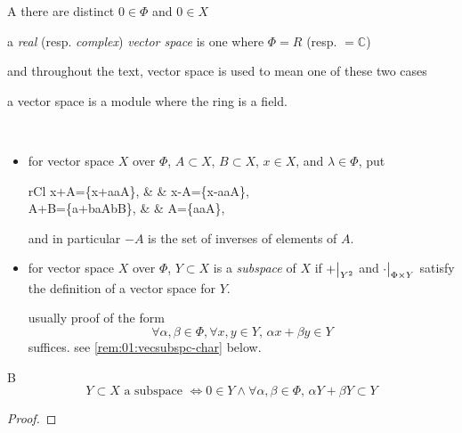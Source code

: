 \begin{rem}{A}
  there are distinct ${0\in\Phi}$ and ${0\in X}$
\end{rem}

\begin{defn}
  a \emph{real} (resp. \emph{complex}) \emph{vector space}
  is one where ${\Phi=R}$ (resp. ${=\mathbb{C}}$)

  and throughout the text, vector space is used to mean one of these
  two cases
\end{defn}

\begin{addcomment}
  a vector space is a module where the ring is a field.
\end{addcomment}

\begin{defn}\
  \begin{itemize}
  \item
    for vector space $X$ over $\Phi$, ${A\subset X}$, ${B\subset X}$,
    ${x\in X}$, and ${\lambda\in\Phi}$, put
    \begin{IEEEeqnarray*}{rCl}
      x+A=\{x+a\mid a\in A\}, & \quad & x-A=\{x-a\mid a\in A\}, \\
      A+B=\{a+b\mid a\in A\land b\in B\}, & \quad &
      \lambda A=\{\lambda a\mid a\in A\},
    \end{IEEEeqnarray*}
    and in particular ${-A}$ is the set of inverses of elements of $A$.
  \item
    for vector space $X$ over $\Phi$, ${Y\subset X}$ is a
    \emph{subspace} of $X$ if $\restr{+}{Y^2}$ and
    $\restr{\cdot}{\Phi\times Y}$ satisfy the definition
    of a vector space for $Y$.
    \begin{addcomment}
      usually proof of the form
      \[
      \forall \alpha,\beta\in\Phi,\forall x,y\in Y,\,
      \alpha x+\beta y\in Y
      \]
      suffices.  see \ref{rem:01:vecsubspc-char} below.
    \end{addcomment}
  \end{itemize}
\end{defn}

\begin{rem}{B}\label{rem:01:vecsubspc-char}
  \[
  Y\subset X\text{ a subspace }
  \iff
  0\in Y\land \forall\alpha,\beta\in\Phi,\, \alpha Y+\beta Y\subset Y
  \]
\end{rem}
\begin{proof}
\end{proof}

